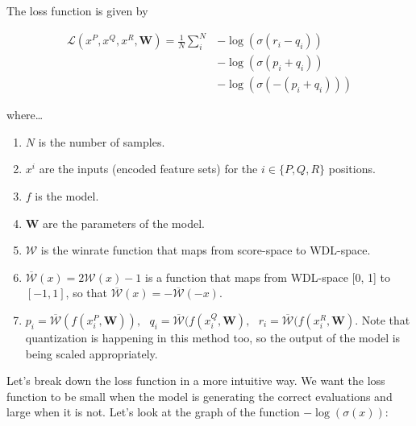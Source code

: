 The loss function is given by

\begin{align*}
\mathcal{L}(x^P, x^Q, x^R, \bm{W})=
\frac{1}{N}
\sum_i^N
& -\log\left(\sigma(r_i - q_i)\right) \\
& -\log\left(\sigma(p_i + q_i)\right) \\
& -\log\left(\sigma(-(p_i + q_i))\right)
\end{align*}

where\dots

\begin{enumerate}
\itemsep0em
\item $N$ is the number of samples.
\item $x^i$ are the inputs (encoded feature sets) for the $i \in \{P,Q,R\}$ positions.
\item $f$ is the model.
\item $\bm{W}$ are the parameters of the model.
\item $\mathcal{W}$ is the winrate function that maps from score-space to WDL-space.
\item $\overline{\mathcal{W}}(x) = 2 \mathcal{W}(x) - 1$ is a function that maps from WDL-space [0, 1] to $[-1, 1]$, so that $\overline{\mathcal{W}}(x) = -\overline{\mathcal{W}}(-x)$.
\item $
p_i = \overline{\mathcal{W}}(f(x^P_i, \bm{W})),\text{ }
q_i = \overline{\mathcal{W}}(f(x^Q_i, \bm{W}),\text{ }
r_i = \overline{\mathcal{W}}(f(x^R_i, \bm{W})
$. Note that quantization is happening in this method too, so the output of the model is being scaled appropriately.
\end{enumerate}



Let's break down the loss function in a more intuitive way. We want the loss function to be small when the model is generating the correct evaluations and large when it is not. Let's look at the graph of the function $-\log(\sigma(x))$:

\begin{figure}[H]
\centering
{}
\end{figure}

